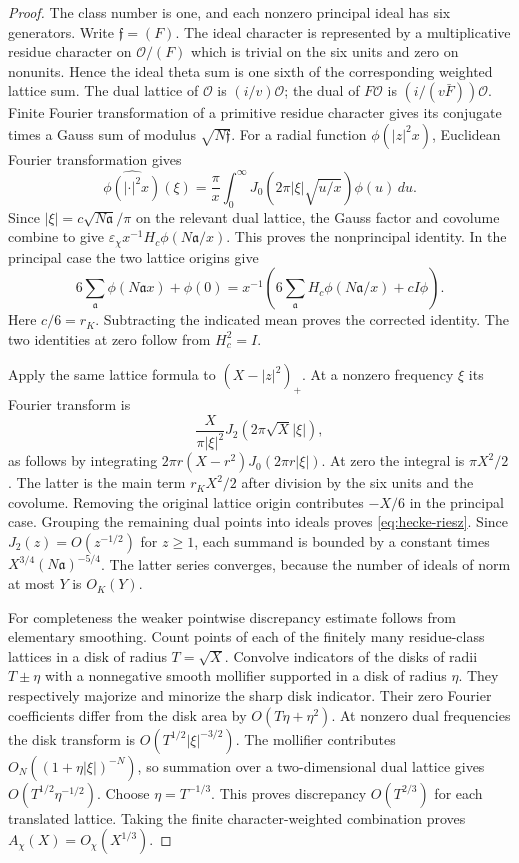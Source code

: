 \begin{proof}
The class number is one, and each nonzero principal ideal has six
generators.  Write $\mathfrak f=(F)$.  The ideal character is represented
by a multiplicative residue character on $\mathcal O/(F)$ which is
trivial on the six units and zero on nonunits.  Hence the ideal theta
sum is one sixth of the corresponding weighted lattice sum.  The dual
lattice of $\mathcal O$ is $(i/v)\mathcal O$; the dual of
$F\mathcal O$ is $(i/(v\bar F))\mathcal O$.
Finite Fourier transformation of a primitive residue character gives
its conjugate times a Gauss sum of modulus $\sqrt{N\mathfrak f}$.
For a radial function $\phi(|z|^2x)$, Euclidean Fourier transformation
gives
\[
 \widehat{\phi(|\cdot|^2x)}(\xi)
   =\frac\pi x\int_0^\infty
             J_0(2\pi|\xi|\sqrt{u/x})\phi(u)\,du.
\]
Since $|\xi|=c\sqrt{N\mathfrak a}/\pi$ on the relevant dual lattice,
the Gauss factor and covolume combine to give
$\varepsilon_\chi x^{-1}H_c\phi(N\mathfrak a/x)$.
This proves the nonprincipal identity.  In the principal case the
two lattice origins give
\[
 6\sum_{\mathfrak a}\phi(N\mathfrak a x)+\phi(0)
 =x^{-1}\left(6\sum_{\mathfrak a}
 H_c\phi(N\mathfrak a/x)+cI\phi\right).
\]
Here $c/6=r_K$.  Subtracting the indicated mean proves the corrected
identity.  The two identities at zero follow from $H_c^2=I$.

Apply the same lattice formula to $(X-|z|^2)_+$.  At a nonzero
frequency $\xi$ its Fourier transform is
\[
 \frac{X}{\pi|\xi|^2}J_2(2\pi\sqrt X|\xi|),
\]
as follows by integrating $2\pi r(X-r^2)J_0(2\pi r|\xi|)$.
At zero the integral is $\pi X^2/2$.  The latter is the main term
$r_KX^2/2$ after division by the six units and the covolume.
Removing the original lattice origin contributes $-X/6$ in the
principal case.  Grouping the remaining dual points into ideals
proves \eqref{eq:hecke-riesz}.  Since
$J_2(z)=O(z^{-1/2})$ for $z\geq1$, each summand is bounded by a
constant times $X^{3/4}(N\mathfrak a)^{-5/4}$.  The latter series
converges, because the number of ideals of norm at most $Y$ is
$O_K(Y)$.

For completeness the weaker pointwise discrepancy estimate follows
from elementary smoothing.  Count points of each of the finitely
many residue-class lattices in a disk of radius $T=\sqrt X$.
Convolve indicators of the disks of radii $T\pm\eta$ with a
nonnegative smooth mollifier supported in a disk of radius $\eta$.
They respectively majorize and minorize the sharp disk indicator.
Their zero Fourier coefficients differ from the disk area by
$O(T\eta+\eta^2)$.  At nonzero dual frequencies the disk transform
is $O(T^{1/2}|\xi|^{-3/2})$.  The mollifier contributes
$O_N((1+\eta|\xi|)^{-N})$, so summation over a two-dimensional
dual lattice gives $O(T^{1/2}\eta^{-1/2})$.
Choose $\eta=T^{-1/3}$.  This proves discrepancy $O(T^{2/3})$
for each translated lattice.  Taking the finite character-weighted
combination proves $A_\chi(X)=O_\chi(X^{1/3})$.
\end{proof}

